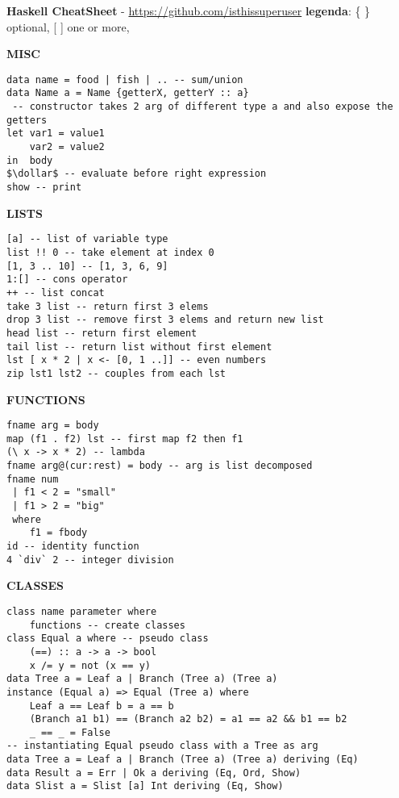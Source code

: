 \documentclass{article}
\newcommand{\dollar}{\mbox{\textdollar}}
\begin{document}
\textbf{Haskell CheatSheet} - \href{https://github.com/isthissuperuser}{https://github.com/isthissuperuser} \textbar{ }  \textbf{legenda}: \{ \} optional, [ ] one or more, 
\begin{multicols*}{4}

\hrulefill

\textbf{MISC}
\begin{lstlisting}
data name = food | fish | .. -- sum/union
data Name a = Name {getterX, getterY :: a} 
 -- constructor takes 2 arg of different type a and also expose the getters
let var1 = value1
    var2 = value2
in  body
$\dollar$ -- evaluate before right expression
show -- print
\end{lstlisting}

\hrulefill

\textbf{LISTS}
\begin{lstlisting}
[a] -- list of variable type
list !! 0 -- take element at index 0
[1, 3 .. 10] -- [1, 3, 6, 9]
1:[] -- cons operator
++ -- list concat
take 3 list -- return first 3 elems
drop 3 list -- remove first 3 elems and return new list
head list -- return first element
tail list -- return list without first element
lst [ x * 2 | x <- [0, 1 ..]] -- even numbers
zip lst1 lst2 -- couples from each lst
\end{lstlisting}

\hrulefill

\textbf{FUNCTIONS}
\begin{lstlisting}
fname arg = body
map (f1 . f2) lst -- first map f2 then f1
(\ x -> x * 2) -- lambda
fname arg@(cur:rest) = body -- arg is list decomposed
fname num
 | f1 < 2 = "small"
 | f1 > 2 = "big"
 where
    f1 = fbody
id -- identity function
4 `div` 2 -- integer division
\end{lstlisting}

\hrulefill

\textbf{CLASSES}
\begin{lstlisting}
class name parameter where
    functions -- create classes
class Equal a where -- pseudo class
    (==) :: a -> a -> bool
    x /= y = not (x == y)
data Tree a = Leaf a | Branch (Tree a) (Tree a)
instance (Equal a) => Equal (Tree a) where
    Leaf a == Leaf b = a == b
    (Branch a1 b1) == (Branch a2 b2) = a1 == a2 && b1 == b2
    _ == _ = False
-- instantiating Equal pseudo class with a Tree as arg
data Tree a = Leaf a | Branch (Tree a) (Tree a) deriving (Eq)
data Result a = Err | Ok a deriving (Eq, Ord, Show)
data Slist a = Slist [a] Int deriving (Eq, Show)
\end{lstlisting}


\end{multicols*}
\end{document}
